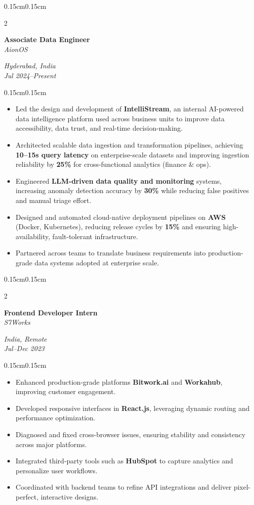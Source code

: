 \documentclass[10pt, letterpaper]{article}
\newenvironment{highlights}{
\begin{itemize}[leftmargin=0.35cm, itemsep=1pt, topsep=1pt, parsep=0pt]
}{
\end{itemize}
}
\newenvironment{onecolentry}{
\begin{adjustwidth}{0.15cm}{0.15cm}
}{
\end{adjustwidth}
}
\newenvironment{twocolentry}[2][]{
\onecolentry
\def\secondColumn{#2}
\setcolumnwidth{\fill,4.2cm}
\begin{paracol}{2}
}{
\switchcolumn \raggedleft \secondColumn
\end{paracol}
\endonecolentry
}
\begin{document}
\begin{twocolentry}{\textit{Hyderabad, India}\\\textit{Jul 2024--Present}}
\textbf{Associate Data Engineer} \\ \textit{AionOS}
\end{twocolentry}
\begin{onecolentry}
\begin{highlights}
\item Led the design and development of \textbf{IntelliStream}, an internal AI-powered data intelligence platform used across business units to improve data accessibility, data trust, and real-time decision-making.
\item Architected scalable data ingestion and transformation pipelines, achieving \textbf{10--15s query latency} on enterprise-scale datasets and improving ingestion reliability by \textbf{25\%} for cross-functional analytics (finance \& ops).
\item Engineered \textbf{LLM-driven data quality and monitoring} systems, increasing anomaly detection accuracy by \textbf{30\%} while reducing false positives and manual triage effort.
\item Designed and automated cloud-native deployment pipelines on \textbf{AWS} (Docker, Kubernetes), reducing release cycles by \textbf{15\%} and ensuring high-availability, fault-tolerant infrastructure.
\item Partnered across teams to translate business requirements into production-grade data systems adopted at enterprise scale.
\end{highlights}
\end{onecolentry}


\vspace{0.2 cm}

\begin{twocolentry}{\textit{India, Remote}\\\textit{Jul--Dec 2023}}
\textbf{Frontend Developer Intern} \\
\textit{S7Works}
\end{twocolentry}
\begin{onecolentry}
\begin{highlights}
\item Enhanced production-grade platforms \textbf{Bitwork.ai} and \textbf{Workahub}, improving customer engagement.  
\item Developed responsive interfaces in \textbf{React.js}, leveraging dynamic routing and performance optimization.
\item Diagnosed and fixed cross-browser issues, ensuring stability and consistency across major platforms.  
\item Integrated third-party tools such as \textbf{HubSpot} to capture analytics and personalize user workflows.  
\item Coordinated with backend teams to refine API integrations and deliver pixel-perfect, interactive designs.  
\end{highlights}
\end{onecolentry}
\end{document}
